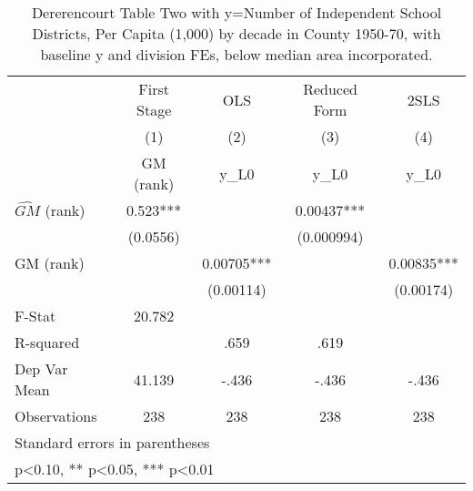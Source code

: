 \begin{table}[htbp]\centering
\def\sym#1{\ifmmode^{#1}\else\(^{#1}\)\fi}
\caption{Dererencourt Table Two with y=Number of Independent School Districts, Per Capita (1,000) by decade in County 1950-70, with baseline y and division FEs, below median area incorporated.}
\begin{tabular}{l*{4}{c}}
\toprule
                    & First Stage   &         OLS   &Reduced Form   &        2SLS   \\
                    &\multicolumn{1}{c}{(1)}&\multicolumn{1}{c}{(2)}&\multicolumn{1}{c}{(3)}&\multicolumn{1}{c}{(4)}\\
                    &\multicolumn{1}{c}{GM  (rank)}&\multicolumn{1}{c}{y\_L0}&\multicolumn{1}{c}{y\_L0}&\multicolumn{1}{c}{y\_L0}\\
\midrule
$\hat{GM}$ (rank)   &       0.523***&               &     0.00437***&               \\
                    &    (0.0556)   &               &  (0.000994)   &               \\
\addlinespace
GM  (rank)          &               &     0.00705***&               &     0.00835***\\
                    &               &   (0.00114)   &               &   (0.00174)   \\
\midrule
F-Stat              &      20.782   &               &               &               \\
R-squared           &               &        .659   &        .619   &               \\
Dep Var Mean        &      41.139   &       -.436   &       -.436   &       -.436   \\
Observations        &         238   &         238   &         238   &         238   \\
\bottomrule
\multicolumn{5}{l}{\footnotesize Standard errors in parentheses}\\
\multicolumn{5}{l}{\footnotesize * p<0.10, ** p<0.05, *** p<0.01}\\
\end{tabular}
\end{table}
